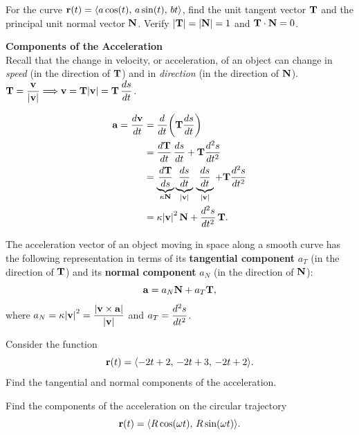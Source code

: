\documentclass[../mathNotesPreamble]{subfiles}
\begin{document}
  \begin{ex*}
    For the curve ${\mathbf{r}}(t)={\left\langle a\cos(t),\,a\sin(t),\,bt \right\rangle}$, find the unit tangent vector ${\mathbf{T}}$ and the principal unit normal vector ${\mathbf{N}}$. Verify ${\left\vert{\mathbf{T}}\right\vert}={\left\vert{\mathbf{N}}\right\vert}=1$ and ${\mathbf{T}}\cdot{\mathbf{N}}=0$.
  \end{ex*}

  \pagebreak

  \textbf{Components of the Acceleration}\\
  Recall that the change in velocity, or acceleration, of an object can change in \textit{speed} (in the direction of ${\mathbf{T}}$) and in \textit{direction} (in the direction of ${\mathbf{N}}$).
  $\displaystyle{\mathbf{T}}=\frac{{\mathbf{v}}}{{\left\vert{\mathbf{v}}\right\vert}} \Longrightarrow {\mathbf{v}}={\mathbf{T}}{\left\vert{\mathbf{v}}\right\vert}={\mathbf{T}}\,\frac{ds}{dt}$.

  \begin{align*}
    {\mathbf{a}}= \frac{d{\mathbf{v}}}{dt}&={\frac{d^{}}{dt^{}}}{\left({\mathbf{T}}\frac{ds}{dt}\right)}\\
      &=\frac{d{\mathbf{T}}}{dt}\,\frac{ds}{dt}+{\mathbf{T}}\frac{d^2s}{dt^2}\\
      &=\underbrace{\frac{d{\mathbf{T}}}{ds}}_{\kappa {\mathbf{N}}}\underbrace{\frac{ds}{dt}}_{{\left\vert{\mathbf{v}}\right\vert}}\,\underbrace{\frac{ds}{dt}}_{{\left\vert{\mathbf{v}}\right\vert}}+{\mathbf{T}} \frac{d^2s}{dt^2}\\
      &=\kappa{\left\vert{\mathbf{v}}\right\vert}^2\, {\mathbf{N}}+\frac{d^2s}{dt^2}\,{\mathbf{T}}.
  \end{align*}   
  
  \begin{thmBox*}
    The acceleration vector of an object moving in space along a smooth curve has the following representation in terms of its \textbf{tangential component} $a_T$ (in the direction of ${\mathbf{T}}$) and its \textbf{normal component} $a_N$ (in the direction of ${\mathbf{N}}$):
      \[{\mathbf{a}}=a_N{\mathbf{N}}+a_T{\mathbf{T}},\]
    where $a_N=\kappa{\left\vert{\mathbf{v}}\right\vert}^2=\displaystyle\frac{{\left\vert{\mathbf{v}}\times{\mathbf{a}}\right\vert}}{{\left\vert{\mathbf{v}}\right\vert}}$ and $a_T=\displaystyle\frac{d^2s}{dt^2}$.
  \end{thmBox*}
  \pagebreak

  \begin{ex*}
    Consider the function
      \[{\mathbf{r}}(t)={\left\langle -2t+2,\,-2t+3,\,-2t+2 \right\rangle}.\]
    Find the tangential and normal components of the acceleration.
  \end{ex*}

  \begin{ex*}
    Find the components of the acceleration on the circular trajectory
      \[{\mathbf{r}}(t)={\left\langle R\cos(\omega t),\,R\sin(\omega t) \right\rangle}.\]
  \end{ex*}
  \pagebreak
\end{document}
